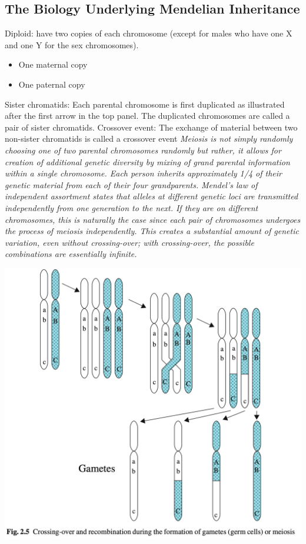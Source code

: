\documentclass[a4paper,twoside,11pt]{article}
\begin{document}
\subsection{The Biology Underlying Mendelian Inheritance}
\textcolor{NavyBlue}{Diploid: }have two copies of each chromosome (except for males who have one X and one Y for the sex chromosomes). 
\begin{itemize}
    \item One maternal copy
    \item One paternal copy
\end{itemize}
\textcolor{NavyBlue}{Sister chromatids: }Each parental chromosome is first duplicated as illustrated after the first arrow in the top panel. The duplicated chromosomes are called a pair of sister chromatids. 
\newline
\newline
\textcolor{NavyBlue}{Crossover event: }The exchange of material between two non-sister chromatids is called a crossover event
\newline
\newline
\textcolor{NavyBlue}{\textit{Meiosis is not simply randomly choosing one of two parental chromosomes randomly but rather, it allows for creation of additional genetic diversity by mixing of grand parental information within a single chromosome. Each person inherits approximately 1/4 of their genetic material from each of their four grandparents.}}
\newline
\newline
\textcolor{NavyBlue}{\textit{Mendel’s law of independent assortment states that alleles at different genetic loci are transmitted independently from one generation to the next. If they are on different chromosomes, this is naturally the case since each pair of chromosomes undergoes the process of meiosis independently. This creates a substantial amount of genetic variation, even without crossing-over; with crossing-over, the possible combinations are essentially infinite.}}
\begin{center}
\includegraphics[scale=0.5]{figure9.png}
\end{center}
\end{document}

